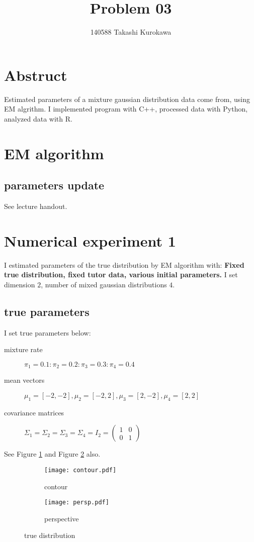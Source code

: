 \documentclass[uplatex]{jsarticle}
\title{Problem 03}
\author{140588 Takashi Kurokawa}
\begin{document}
  \maketitle
%
  \section{Abstruct}
	\indent
	  Estimated parameters of a mixture gaussian distribution data come from, using EM algrithm. I implemented program with C++, processed data with Python, analyzed data with R. 
	\par
%
  \section{EM algorithm}
    \subsection{parameters update}
      \indent
	See lecture handout.
      \par
%
  \section{Numerical experiment 1}
    \indent
      I estimated parameters of the true distribution by EM algorithm with: \textbf{Fixed true distribution, fixed tutor data, various initial parameters.} I set dimension $2$, number of mixed gaussian distributions $4$.
    \par
    \subsection{true parameters}
      \indent
	I set true parameters below:
	\begin{description}
	  \item[mixture rate] $\pi_1 = 0.1 : \pi_2 =  0.2 : \pi_3 = 0.3 : \pi_4 = 0.4$
	  \item[mean vectors] $\mu_1 = [-2,-2], \mu_2 = [-2,2], \mu_3 = [2,-2], \mu_4 = [2,2]$
	  \item[covariance matrices]
	    $
	      \Sigma_1 = \Sigma_2 = \Sigma_3 = \Sigma_4 = I_2 =
	      \begin{pmatrix}
		1 & 0
		\\
		0 & 1
	      \end{pmatrix}
	    $
	\end{description}
	See Figure \ref{fig:true_contour} and Figure \ref{fig:true_persp} also.
	\begin{figure}[h]
	\centering
	  \begin{subfigure}{0.48\columnwidth}
	  \centering
	  \texttt{[image: contour.pdf]}
	  \caption{contour}
	  \label{fig:true_contour}
	  \end{subfigure}
	  \begin{subfigure}{0.48\columnwidth}
	  \centering
	  \texttt{[image: persp.pdf]}
	  \caption{perspective}
	  \label{fig:true_persp}
	  \end{subfigure}
	\caption{true distribution}
	\label{fig:true}
	\end{figure}
      \par
\end{document}
